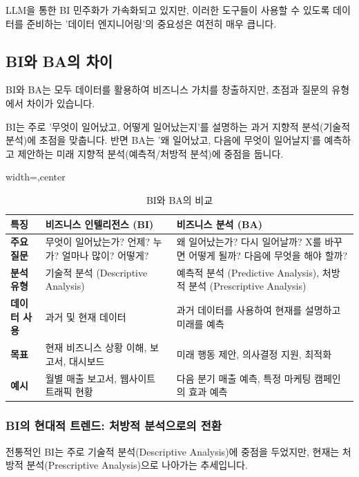 \documentclass[11pt,a4paper]{article}
\theoremstyle{definition}
\begin{document}
\begin{warningbox}[title=데이터 엔지니어링의 중요성]
LLM을 통한 BI 민주화가 가속화되고 있지만, 이러한 도구들이 사용할 수 있도록 데이터를 준비하는 '데이터 엔지니어링'의 중요성은 여전히 매우 큽니다.
\end{warningbox}

\subsection{BI와 BA의 차이}
BI와 BA는 모두 데이터를 활용하여 비즈니스 가치를 창출하지만, 초점과 질문의 유형에서 차이가 있습니다.

\begin{summarybox}[title=핵심 요약: 과거 vs. 미래]
BI는 주로 '무엇이 일어났고, 어떻게 일어났는지'를 설명하는 과거 지향적 분석(기술적 분석)에 초점을 맞춥니다. 반면 BA는 '왜 일어났고, 다음에 무엇이 일어날지'를 예측하고 제안하는 미래 지향적 분석(예측적/처방적 분석)에 중점을 둡니다.
\end{summarybox}

\begin{table}[h!]
\centering
\caption{BI와 BA의 비교}
\label{tab:bi_ba_comparison}
\begin{adjustbox}{width=\textwidth,center}
\begin{tabular}{p{}p{}p{}}
\toprule
\textbf{특징} & \textbf{비즈니스 인텔리전스 (BI)} & \textbf{비즈니스 분석 (BA)} \\
\midrule
\textbf{주요 질문} & 무엇이 일어났는가? 언제? 누가? 얼마나 많이? 어떻게? & 왜 일어났는가? 다시 일어날까? X를 바꾸면 어떻게 될까? 다음에 무엇을 해야 할까? \\
\textbf{분석 유형} & 기술적 분석 (Descriptive Analysis) & 예측적 분석 (Predictive Analysis), 처방적 분석 (Prescriptive Analysis) \\
\textbf{데이터 사용} & 과거 및 현재 데이터 & 과거 데이터를 사용하여 현재를 설명하고 미래를 예측 \\
\textbf{목표} & 현재 비즈니스 상황 이해, 보고서, 대시보드 & 미래 행동 제안, 의사결정 지원, 최적화 \\
\textbf{예시} & 월별 매출 보고서, 웹사이트 트래픽 현황 & 다음 분기 매출 예측, 특정 마케팅 캠페인의 효과 예측 \\
\bottomrule
\end{tabular}
\end{adjustbox}
\end{table}

\subsubsection{BI의 현대적 트렌드: 처방적 분석으로의 전환}
전통적인 BI는 주로 기술적 분석(Descriptive Analysis)에 중점을 두었지만, 현재는 처방적 분석(Prescriptive Analysis)으로 나아가는 추세입니다.
\end{document}
